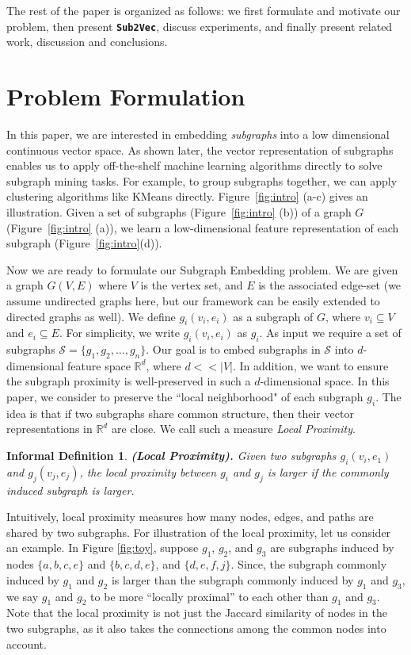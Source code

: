 \documentclass[sigconf]{acmart}
\newcommand{\alg}{{\bf {\tt Sub2Vec}}\xspace}
\newtheorem{informaldefinition}{Informal Definition}
\newcommand{\s}{\mathcal{S}}
\begin{document}
 The rest of the paper is organized as follows: we first formulate and motivate our problem, then present \alg, discuss experiments, and finally present related work, discussion and conclusions. 


\section{Problem Formulation}
\label{sec:prob}

In this paper, we are interested in embedding \emph{subgraphs} into a low dimensional continuous vector space. As shown later, the vector representation of subgraphs enables us to apply off-the-shelf machine learning algorithms directly to solve subgraph mining tasks. For example, to group subgraphs together, we can apply clustering algorithms like KMeans directly. Figure~\ref{fig:intro} (a-c) gives an illustration. Given a set of subgraphs (Figure~\ref{fig:intro} (b)) of a graph $G$ (Figure~\ref{fig:intro} (a)), we learn  a low-dimensional feature representation of each subgraph (Figure~\ref{fig:intro}(d)).


Now we are ready to formulate  our Subgraph Embedding problem. We are given a graph $G(V,E)$ where $V$ is the vertex set, and $E$ is the associated edge-set (we assume undirected graphs here, but our framework can be easily extended to directed graphs as well). We define $g_i(v_i, e_i)$ as a subgraph of $G$, where $v_i \subseteq V$ and $e_i \subseteq E$. For simplicity, we write $g_i(v_i, e_i)$ as $g_i$. As input we require a set of subgraphs  $\s = \{g_1,g_2, \dots, g_n \}$. Our goal is to embed  subgraphs in $\s$ into $d$-dimensional feature space $\mathbb{R}^d$, where $d<< |V|$. In addition, we want to ensure the subgraph proximity is well-preserved in such a $d$-dimensional space.  
In this paper, we consider to preserve the ``local neighborhood" of each subgraph $g_i$. The idea is that if two subgraphs share common structure, then their vector representations in $\mathbb{R}^d$ are close. We call such a measure \emph{Local Proximity}.  

\begin{informaldefinition}\textbf{(Local Proximity).} Given two subgraphs $g_i(v_i, e_1)$ and $g_j(v_j, e_j)$, the local proximity between $g_i$ and $g_j$  is larger if the commonly induced subgraph is larger. 
\end{informaldefinition}

Intuitively, local proximity measures how many nodes, edges, and paths are shared by two subgraphs. For illustration of the local proximity, let us consider an example. In Figure \ref{fig:toy}, suppose $g_1$, $g_2$, and $g_3$ are subgraphs induced  by nodes $\{a, b, c, e \}$ and $\{b, c, d, e\}$, and $\{d, e, f, j\}$. Since, the subgraph commonly induced by $g_1$ and $g_2$ is larger than the subgraph commonly induced by $g_1$ and $g_3$, we say $g_1$ and $g_2$ to be more ``locally proximal'' to each other than $g_1$ and $g_3$. Note that the local proximity is not just the Jaccard similarity of nodes in the two subgraphs, as it also takes the connections among the common nodes into account.
\end{document}

